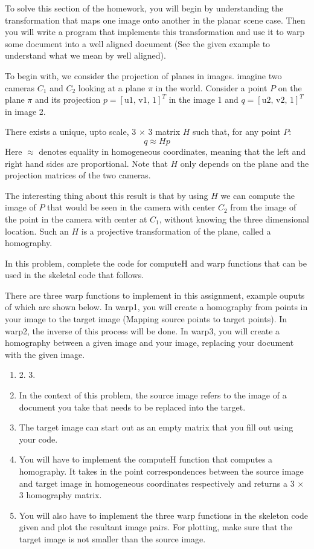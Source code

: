 \documentclass[11pt]{article}
\begin{document}
To solve this section of the homework, you will begin by understanding
the transformation that maps one image onto another in the planar scene
case. Then you will write a program that implements this transformation
and use it to warp some document into a well aligned document (See the
given example to understand what we mean by well aligned).

To begin with, we consider the projection of planes in images. imagine
two cameras \(C_1\) and \(C_2\) looking at a plane \(\pi\) in the world.
Consider a point \(P\) on the plane \(\pi\) and its projection
\(p=[\text{u1, v1, 1}]^T\) in the image 1 and \(q=[\text{u2, v2, 1}]^T\)
in image 2.

There exists a unique, upto scale, 3 \(\times\) 3 matrix \(H\) such
that, for any point \(P\): \[q \approx Hp\] Here \(\approx\) denotes
equality in homogeneous coordinates, meaning that the left and right
hand sides are proportional. Note that \(H\) only depends on the plane
and the projection matrices of the two cameras.

The interesting thing about this result is that by using \(H\) we can
compute the image of \(P\) that would be seen in the camera with center
\(C_2\) from the image of the point in the camera with center at
\(C_1\), without knowing the three dimensional location. Such an \(H\)
is a projective transformation of the plane, called a homography.

In this problem, complete the code for computeH and warp functions that
can be used in the skeletal code that follows.

There are three warp functions to implement in this assignment, example
ouputs of which are shown below. In warp1, you will create a homography
from points in your image to the target image (Mapping source points to
target points). In warp2, the inverse of this process will be done. In
warp3, you will create a homography between a given image and your
image, replacing your document with the given image.

\begin{enumerate}
\def\labelenumi{\arabic{enumi}.}
\item
   2. 3.
\item
  In the context of this problem, the source image refers to the image
  of a document you take that needs to be replaced into the target.
\item
  The target image can start out as an empty matrix that you fill out
  using your code.
\item
  You will have to implement the computeH function that computes a
  homography. It takes in the point correspondences between the source
  image and target image in homogeneous coordinates respectively and
  returns a 3 \(\times\) 3 homography matrix.
\item
  You will also have to implement the three warp functions in the
  skeleton code given and plot the resultant image pairs. For plotting,
  make sure that the target image is not smaller than the source image.
\end{enumerate}
\end{document}
